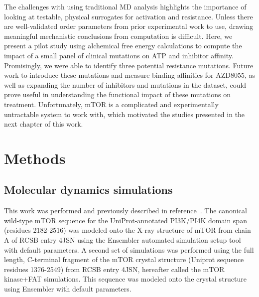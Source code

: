 \documentclass[phd,tocprelim]{cornell}
\begin{document}
The challenges with using traditional MD analysis highlights the importance of looking at testable, physical surrogates for activation and resistance. Unless there are well-validated order parameters from prior experimental work to use, drawing meaningful mechanistic conclusions from computation is difficult. Here, we present a pilot study using alchemical free energy calculations to compute the impact of a small panel of clinical mutations on ATP and inhibitor affinity. Promisingly, we were able to identify three potential resistance mutations. Future work to introduce these mutations and measure binding affinities for AZD8055, as well as expanding the number of inhibitors and mutations in the dataset, could prove useful in understanding the functional impact of these mutations on treatment. Unfortunately, mTOR is a complicated and experimentally untractable system to work with, which motivated the studies presented in the next chapter of this work. 

\section{Methods}
\subsection{Molecular dynamics simulations}
This work was performed and previously described in reference~\cite{Xu:2016fw}. The canonical wild-type mTOR sequence for the UniProt-annotated PI3K/PI4K domain span (residues 2182-2516) was modeled onto the X-ray structure of mTOR from chain A of
RCSB entry 4JSN using the Ensembler automated simulation setup tool~\citep{Parton:2016cc} with default parameters. A second set of simulations was performed using the full length, C-terminal fragment of the mTOR crystal structure (Uniprot sequence residues 1376-2549) from RCSB entry 4JSN, hereafter called the mTOR kinase+FAT simulations. This sequence was modeled onto the crystal structure using Ensembler with default parameters. 
\end{document}
